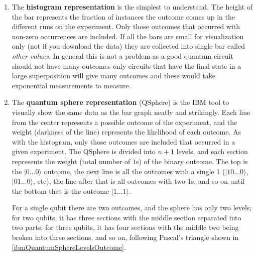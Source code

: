 \documentclass[a4paper,10pt]{article}
\begin{document}
\begin{enumerate}
    \item The \textbf{histogram representation} is the simplest to understand. The height of the bar represents the fraction of instances the outcome comes up in the different runs on the experiment. Only those outcomes that occurred with non-zero occurrences are included. If all the bars are small for visualization only (not if you download the data) they are collected into single bar called \textit{other values}. In general this is not a problem as a good quantum circuit should not have many outcomes only circuits that have the final state in a large superposition will give many outcomes and these would take exponential measurements to measure.
    \item The \textbf{quantum sphere representation} (QSphere) is the IBM tool to visually show the same data as the bar graph neatly and strikingly. Each line from the center represents a possible outcome of the experiment, and the weight (darkness of the line) represents the likelihood of each outcome. As with the histogram, only those outcomes are included that occurred in a given experiment. The QSphere is divided into $n+1$ levels, and each section represents the weight (total number of $1$s) of the binary outcome. The top is the $|0\ldots0\rangle$ outcome, the next line is all the outcomes with a single 1 ($|10\ldots0\rangle$, $|01\ldots0\rangle$, etc), the line after that is all outcomes with two $1$s, and so on until the bottom that is the outcome $|1\ldots1\rangle$. 
    
    For a single qubit there are two outcomes, and the sphere has only two levels; for two qubits, it has three sections with the middle section separated into two parts; for three qubits, it has four sections with the middle two being broken into three sections, and so on, following Pascal’s triangle shown in \autoref{ibmQuantumSphereLevelsOutcome}.
    

\end{enumerate}
\end{document}
